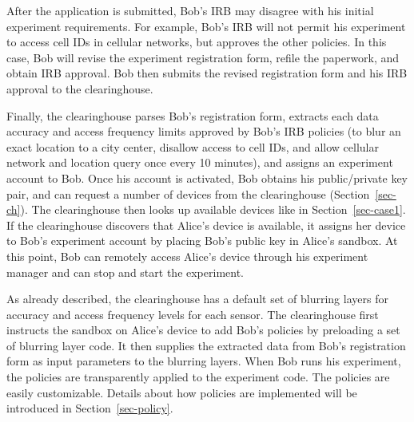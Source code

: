 After the application is submitted, Bob's IRB may disagree with 
his initial experiment requirements. For example, Bob's IRB will not permit
his experiment to access cell IDs in cellular networks, but 
approves the other policies. 
In this case, Bob will revise the experiment registration form, refile the paperwork, 
and obtain IRB approval. Bob then submits the revised  
registration form and his IRB approval to the clearinghouse.

Finally, the clearinghouse
parses Bob's registration form, extracts each data accuracy and access 
frequency limits approved by Bob's IRB policies (to blur an exact location 
to a city center, disallow access to cell IDs, and allow cellular network and 
location query once every 10 minutes), and assigns an experiment 
account to Bob. Once his account is activated, 
Bob obtains his public/private key pair, and can request a number of devices from the 
clearinghouse (Section~\ref{sec-ch}). The clearinghouse then looks up
available devices like in Section~\ref{sec-case1}. If the clearinghouse 
discovers that Alice's device is available, it
assigns her device to Bob's experiment account by placing Bob's
public key in Alice's sandbox. At this point, Bob can remotely access Alice's 
device through his experiment manager and can stop and start the experiment.

As already described, the clearinghouse has a default set of blurring layers 
for accuracy and access frequency levels for each sensor. 
The clearinghouse first instructs 
the sandbox on Alice's device to add Bob's policies by preloading
a set of blurring layer code. It then supplies the extracted data from 
Bob's registration form as input parameters to the blurring layers. 
When Bob runs his experiment, the policies are transparently applied
to the experiment code. 
The policies are easily customizable. Details about
how policies are implemented will be introduced in Section~\ref{sec-policy}.

